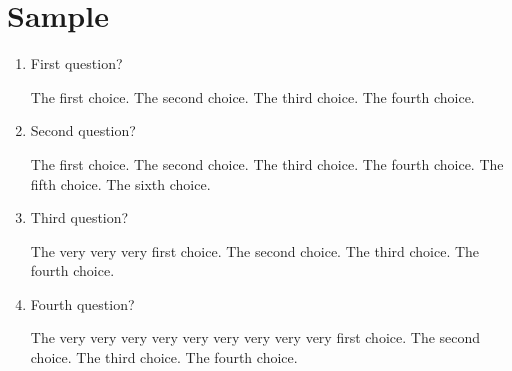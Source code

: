 \documentclass{ltxdoc}
\begin{document}
 \section{Sample}
\begin{enumerate}

\item First question?
\begin{choices}
    \choice The first choice.
    \choice The second choice.
    \choice The third choice.
    \choice The fourth choice.
\end{choices}

\item Second question?
\begin{choices}
    \choice The first choice.
    \choice The second choice.
    \choice The third choice.
    \choice The fourth choice.
    \choice The fifth choice.
    \choice The sixth choice.
\end{choices}

\item Third question?
\begin{choices}
    \choice The very very very first choice.
    \choice The second choice.
    \choice The third choice.
    \choice The fourth choice.
\end{choices}

\item Fourth question?
\begin{choices}
    \choice The very very very very very very very very very first choice.
    \choice The second choice.
    \choice The third choice.
    \choice The fourth choice.
\end{choices}

\end{enumerate}
\end{document}
